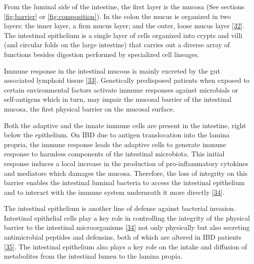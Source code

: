 \documentclass[
  12pt,
  a4paper,
  twoside,
  openright]{book}
\begin{document}
From the luminal side of the intestine, the first layer is the mucosa (See sections \ref{fig:barrier} or \ref{fig:composition}).
In the colon the mucus is organized in two layers: the inner layer, a firm mucus layer; and the outer, loose mucus layer {[}\protect\hyperlink{ref-okumura2017}{32}{]}.
The intestinal epithelium is a single layer of cells organized into crypts and villi (and circular folds on the large intestine) that carries out a diverse array of functions besides digestion performed by specialized cell lineages.

Immune response in the intestinal mucous is mainly excreted by the gut associated lymphoid tissue {[}\protect\hyperlink{ref-faria2012}{33}{]}.
Genetically predisposed patients when exposed to certain environmental factors activate immune responses against microbials or self-antigens which in turn, may impair the mucosal barrier of the intestinal mucosa, the first physical barrier on the mucosal surface.

Both the adaptive and the innate immune cells are present in the intestine, right below the epithelium.
On IBD due to antigen translocation into the lamina propria, the immune response leads the adaptive cells to generate immune response to harmless components of the intestinal microbiota.
This initial response induces a local increase in the production of pro-inflammatory cytokines and mediators which damages the mucosa.
Therefore, the loss of integrity on this barrier enables the intestinal luminal bacteria to access the intestinal epithelium and to interact with the immune system underneath it more directly {[}\protect\hyperlink{ref-hisamatsu2013}{34}{]}.

The intestinal epithelium is another line of defense against bacterial invasion.
Intestinal epithelial cells play a key role in controlling the integrity of the physical barrier to the intestinal microorganisms {[}\protect\hyperlink{ref-hisamatsu2013}{34}{]} not only physically but also secreting antimicrobial peptides and defensins, both of which are altered in IBD patients {[}\protect\hyperlink{ref-michielan2015}{35}{]}.
The intestinal epithelium also plays a key role on the intake and diffusion of metabolites from the intestinal lumen to the lamina propia.
\end{document}
